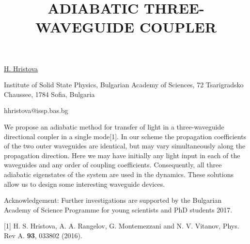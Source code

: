 \title{ADIABATIC THREE-WAVEGUIDE COUPLER}

\underline{H. Hristova} 

{\normalsize{\vspace{-4mm}
Institute of Solid State Physics, Bulgarian Academy of Sciences, 72 Tsarigradsko Chaussee, 1784 Sofia, Bulgaria



\email hhristova@issp.bas.bg}}

We propose an adiabatic method for transfer of light in a three-waveguide directional coupler in a single mode[1]. In our scheme the propagation coefficients of the two outer waveguides are identical, but may vary simultaneously along the propagation direction. Here we may have initially any light input in each of the waveguides and any order of coupling coefficients. Consequently, all three adiabatic eigenstates of the system are used in the dynamics. These solutions allow us to design some interesting waveguide devices.

Acknowledgement:
Further investigations are supported by the Bulgarian Academy of Science Programme for young scientists and PhD students 2017.

{\normalsize
[1] H. S. Hristova, A. A. Rangelov, G. Montemezzani and N. V. Vitanov, Phys. Rev A. \textbf{93}, 033802 (2016).
}

\vspace{\baselineskip}
